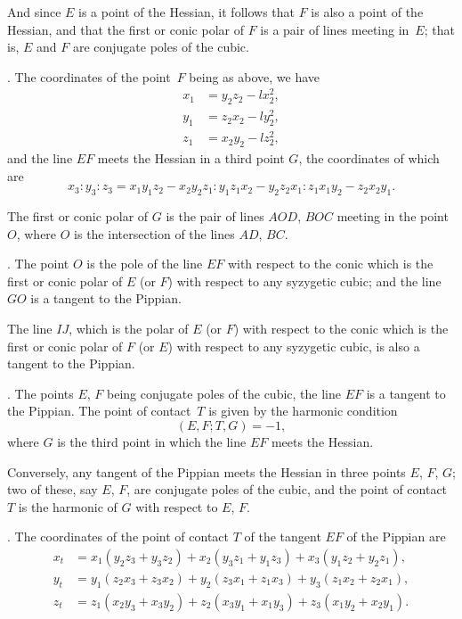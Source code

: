 \documentclass[12pt,a4paper]{article}
\theoremstyle{definition}
\begin{document}
And since $E$ is a point of the Hessian, it follows that $F$ is
also a point of the Hessian, and that the first or conic polar
of $F$ is a pair of lines meeting in~$E$; that is, $E$ and $F$ are
conjugate poles of the cubic.

. The coordinates of the point~$F$ being as above, we have
\begin{align*}
x_{1} &= y_{2}z_{2} - lx_{2}^{2}, \\
y_{1} &= z_{2}x_{2} - ly_{2}^{2}, \\
z_{1} &= x_{2}y_{2} - lz_{2}^{2},
\end{align*}
and the line $EF$ meets the Hessian in a third point $G$, the
coordinates of which are
\[
x_{3} : y_{3} : z_{3} = x_{1}y_{1}z_{2} - x_{2}y_{2}z_{1}
: y_{1}z_{1}x_{2} - y_{2}z_{2}x_{1}
: z_{1}x_{1}y_{2} - z_{2}x_{2}y_{1}.
\]

The first or conic polar of $G$ is the pair of lines $AOD$, $BOC$
meeting in the point $O$, where $O$ is the intersection of the
lines $AD$, $BC$.

. The point $O$ is the pole of the line $EF$ with respect to
the conic which is the first or conic polar of $E$ (or $F$) with
respect to any syzygetic cubic; and the line $GO$ is a tangent
to the Pippian.

The line $IJ$, which is the polar of $E$ (or $F$) with respect
to the conic which is the first or conic polar of $F$ (or $E$)
with respect to any syzygetic cubic, is also a tangent to the
Pippian.

. The points $E$, $F$ being conjugate poles of the cubic,
the line $EF$ is a tangent to the Pippian. The point of contact~$T$
is given by the harmonic condition
\[
(E, F; T, G) = -1,
\]
where $G$ is the third point in which the line $EF$ meets the Hessian.

Conversely, any tangent of the Pippian meets the Hessian
in three points $E$, $F$, $G$; two of these, say $E$, $F$, are
conjugate poles of the cubic, and the point of contact $T$ is
the harmonic of $G$ with respect to $E$, $F$.

. The coordinates of the point of contact $T$ of the tangent
$EF$ of the Pippian are
\begin{align*}
x_{t} &= x_{1}(y_{2}z_{3} + y_{3}z_{2}) + x_{2}(y_{3}z_{1} + y_{1}z_{3})
+ x_{3}(y_{1}z_{2} + y_{2}z_{1}), \\
y_{t} &= y_{1}(z_{2}x_{3} + z_{3}x_{2}) + y_{2}(z_{3}x_{1} + z_{1}x_{3})
+ y_{3}(z_{1}x_{2} + z_{2}x_{1}), \\
z_{t} &= z_{1}(x_{2}y_{3} + x_{3}y_{2}) + z_{2}(x_{3}y_{1} + x_{1}y_{3})
+ z_{3}(x_{1}y_{2} + x_{2}y_{1}).
\end{align*}
\end{document}
